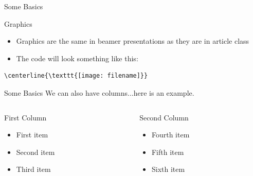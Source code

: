 \documentclass{beamer}  %
\begin{document}
\begin{frame}[containsverbatim]{Some Basics}

\begin{block}{Graphics}
 \begin{itemize}
 \item Graphics are the same in beamer presentations as they are in article class 
 \item The code will look something like this:
\end{itemize}
\end{block}

\begin{verbatim}
\centerline{\texttt{[image: filename]}}
\end{verbatim}
 
\end{frame}


\begin{frame}{Some Basics}
 We can also have columns...here is an example. 


\begin{columns} %
  
 \begin{column}{0.50\textwidth} %
  \begin{block}{First Column} %
   \begin{itemize}
     \item First item
     \item Second item
     \item Third item
   \end{itemize}
  \end{block}
 \end{column}

 \begin{column}{0.50\textwidth} %
  \begin{block}{Second Column}
   \begin{itemize}
    \item Fourth item
    \item Fifth item
    \item Sixth item
   \end{itemize}
  \end{block}
 \end{column}

\end{columns}

\end{frame}
\end{document}
